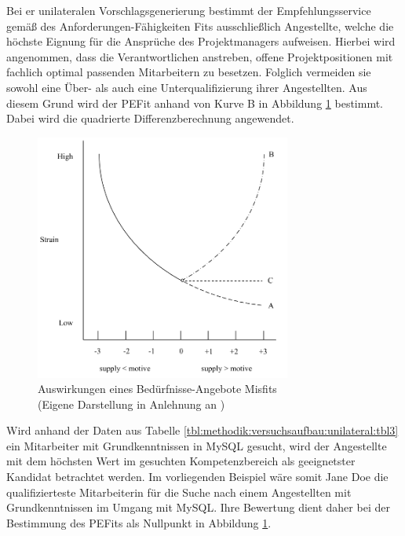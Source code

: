 Bei er unilateralen Vorschlagsgenerierung bestimmt der Empfehlungsservice gemäß des Anforderungen-Fähigkeiten Fits ausschließlich Angestellte, welche die höchste Eignung für die Ansprüche des Projektmanagers aufweisen. Hierbei wird angenommen, dass die Verantwortlichen anstreben, offene Projektpositionen mit fachlich optimal passenden Mitarbeitern zu besetzen. Folglich vermeiden sie sowohl eine Über- als auch eine Unterqualifizierung ihrer Angestellten. Aus diesem Grund wird der \ac{PEFit} anhand von Kurve B in Abbildung \ref{fig:methodik:versuchsaufbau:unilateral:abb2} bestimmt. Dabei wird die quadrierte Differenzberechnung angewendet.

\begin{figure}[h]
	\centering
	\includegraphics[width=0.75\textwidth]{gfx/ueberschuss_supply_motive.png}
	\caption{Auswirkungen eines Bedürfnisse-Angebote Misfits\\(Eigene Darstellung in Anlehnung an \cite[S. 23]{edwards:2008})}
	\label{fig:methodik:versuchsaufbau:unilateral:abb2}
\end{figure}

Wird anhand der Daten aus Tabelle \ref{tbl:methodik:versuchsaufbau:unilateral:tbl3} ein Mitarbeiter mit Grundkenntnissen in MySQL gesucht, wird der Angestellte mit dem höchsten Wert im gesuchten Kompetenzbereich als geeignetster Kandidat betrachtet werden. Im vorliegenden Beispiel wäre somit Jane Doe die qualifizierteste Mitarbeiterin für die Suche nach einem Angestellten mit Grundkenntnissen im Umgang mit MySQL. Ihre Bewertung dient daher bei der Bestimmung des \acp{PEFit} als Nullpunkt in Abbildung \ref{fig:methodik:versuchsaufbau:unilateral:abb2}.

